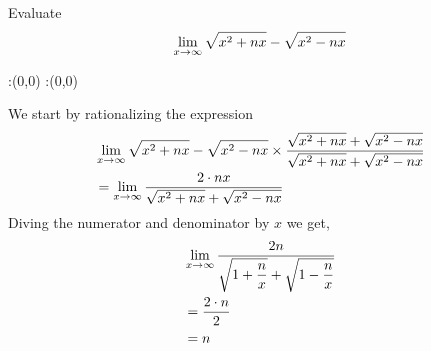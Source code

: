 



\question Evaluate 
\begin{align}
\lim_{x \to \infty} \sqrt{x^2 + n x} - \sqrt{x^2 - n x} \notag
\end{align} 


\watchout

\ifprintanswers
  \begin{marginfigure}
      :(0,0)
      :(0,0)
    \figdrawbegin{}
      \figdrawline [100,101]
    \figdrawend
    \figvisu{\figBoxA}{}{%
    }
    \centerline{\box\figBoxA}
  \end{marginfigure}
\fi 

\begin{solution}
We start by rationalizing the expression
\begin{align}
&\lim_{x \to \infty} \sqrt{x^2 + n x} - \sqrt{x^2 - n x} \times \dfrac{\sqrt{x^2 + n x} + \sqrt{x^2 - n x}}{\sqrt{x^2 + n x} + \sqrt{x^2 - n x}} \\
&= \lim_{x \to \infty} \dfrac{2 \cdot n x}{\sqrt{x^2 + n x} + \sqrt{x^2 - n x}} 
\end{align}
Diving the numerator and denominator by $x$ we get, 
\begin{align}
&\lim_{x \to \infty}  \dfrac{2n}{{\sqrt{1+ \dfrac{n}{x}}} + {\sqrt{1- \dfrac{n}{x}}}} \\
&=  \dfrac{2\cdot {n}}{2} \\
&= n
\end{align} 
\end{solution}


